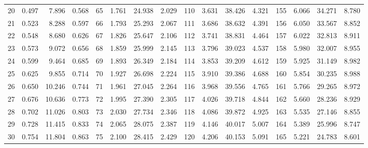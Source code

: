 \begin{table}[!h]
{\begin{tabular}{rrrr|rrrr|rrrr|rrrr}
 20 & \tiny{  0.497} &   7.896 & \tiny{  0.568} &  65 & \tiny{  1.761} &  24.938 & \tiny{  2.029} & 110 & \tiny{  3.631} &  38.426 & \tiny{  4.321} & 155 & \tiny{  6.066} &  34.271 & \tiny{  8.780}\\
 21 & \tiny{  0.523} &   8.288 & \tiny{  0.597} &  66 & \tiny{  1.793} &  25.293 & \tiny{  2.067} & 111 & \tiny{  3.686} &  38.632 & \tiny{  4.391} & 156 & \tiny{  6.050} &  33.567 & \tiny{  8.852}\\
 22 & \tiny{  0.548} &   8.680 & \tiny{  0.626} &  67 & \tiny{  1.826} &  25.647 & \tiny{  2.106} & 112 & \tiny{  3.741} &  38.831 & \tiny{  4.464} & 157 & \tiny{  6.022} &  32.813 & \tiny{  8.911}\\
 23 & \tiny{  0.573} &   9.072 & \tiny{  0.656} &  68 & \tiny{  1.859} &  25.999 & \tiny{  2.145} & 113 & \tiny{  3.796} &  39.023 & \tiny{  4.537} & 158 & \tiny{  5.980} &  32.007 & \tiny{  8.955}\\
 24 & \tiny{  0.599} &   9.464 & \tiny{  0.685} &  69 & \tiny{  1.893} &  26.349 & \tiny{  2.184} & 114 & \tiny{  3.853} &  39.209 & \tiny{  4.612} & 159 & \tiny{  5.925} &  31.149 & \tiny{  8.982}\\
 25 & \tiny{  0.625} &   9.855 & \tiny{  0.714} &  70 & \tiny{  1.927} &  26.698 & \tiny{  2.224} & 115 & \tiny{  3.910} &  39.386 & \tiny{  4.688} & 160 & \tiny{  5.854} &  30.235 & \tiny{  8.988}\\
 26 & \tiny{  0.650} &  10.246 & \tiny{  0.744} &  71 & \tiny{  1.961} &  27.045 & \tiny{  2.264} & 116 & \tiny{  3.968} &  39.556 & \tiny{  4.765} & 161 & \tiny{  5.766} &  29.265 & \tiny{  8.972}\\
 27 & \tiny{  0.676} &  10.636 & \tiny{  0.773} &  72 & \tiny{  1.995} &  27.390 & \tiny{  2.305} & 117 & \tiny{  4.026} &  39.718 & \tiny{  4.844} & 162 & \tiny{  5.660} &  28.236 & \tiny{  8.929}\\
 28 & \tiny{  0.702} &  11.026 & \tiny{  0.803} &  73 & \tiny{  2.030} &  27.734 & \tiny{  2.346} & 118 & \tiny{  4.086} &  39.872 & \tiny{  4.925} & 163 & \tiny{  5.535} &  27.146 & \tiny{  8.855}\\
 29 & \tiny{  0.728} &  11.415 & \tiny{  0.833} &  74 & \tiny{  2.065} &  28.075 & \tiny{  2.387} & 119 & \tiny{  4.146} &  40.017 & \tiny{  5.007} & 164 & \tiny{  5.389} &  25.996 & \tiny{  8.747}\\
 30 & \tiny{  0.754} &  11.804 & \tiny{  0.863} &  75 & \tiny{  2.100} &  28.415 & \tiny{  2.429} & 120 & \tiny{  4.206} &  40.153 & \tiny{  5.091} & 165 & \tiny{  5.221} &  24.783 & \tiny{  8.601}\\

\end{tabular}}
\end{table}
